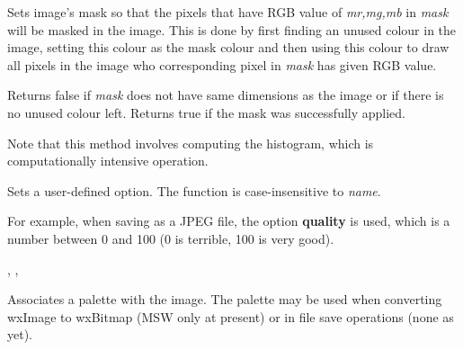 


Sets image's mask so that the pixels that have RGB value of {\it mr,mg,mb}
in {\it mask} will be masked in the image. This is done by first finding an
unused colour in the image, setting this colour as the mask colour and then
using this colour to draw all pixels in the image who corresponding pixel
in {\it mask} has given RGB value.


Returns false if {\it mask} does not have same dimensions as the image or if
there is no unused colour left. Returns true if the mask was successfully
applied.


Note that this method involves computing the histogram, which is
computationally intensive operation.


\label{wximagesetoption}



Sets a user-defined option. The function is case-insensitive to {\it name}.

For example, when saving as a JPEG file, the option {\bf quality} is
used, which is a number between 0 and 100 (0 is terrible, 100 is very good).


,\rtfsp
{},\rtfsp
{}


\label{wximagesetpalette}


Associates a palette with the image. The palette may be used when converting
wxImage to wxBitmap (MSW only at present) or in file save operations (none as yet).


\label{wximagesetrgb}

